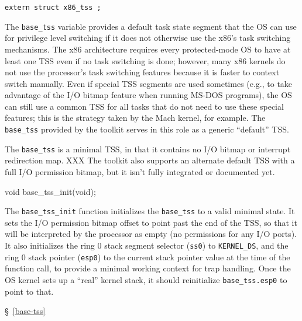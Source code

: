 \label{base-tss}
\begin{apisyn}

	{\tt extern struct x86_tss ;}
\end{apisyn}
\begin{apidesc}
	The {\tt base_tss} variable
	provides a default task state segment
	that the OS can use for privilege level switching
	if it does not otherwise use the x86's task switching mechanisms.
	The x86 architecture requires every protected-mode OS
	to have at least one TSS even if no task switching is done;
	however, many x86 kernels
	do not use the processor's task switching features
	because it is faster to context switch manually.
	Even if special TSS segments are used sometimes
	(e.g., to take advantage of the I/O bitmap feature
	when running MS-DOS programs),
	the OS can still use a common TSS
	for all tasks that do not need to use these special features;
	this is the strategy taken by the Mach kernel, for example.
	The {\tt base_tss} provided by the toolkit
	serves in this role as a generic ``default'' TSS.

	The {\tt base_tss} is a minimal TSS,
	in that it contains no I/O bitmap or interrupt redirection map.
	XXX The toolkit also supports an alternate default TSS
	with a full I/O permission bitmap,
	but it isn't fully integrated or documented yet.
\end{apidesc}

\label{base-tss-init}
\begin{apisyn}

	\funcproto void base_tss_init(void);
\end{apisyn}
\begin{apidesc}
	The {\tt base_tss_init} function
	initializes the {\tt base_tss} to a valid minimal state.
	It sets the I/O permission bitmap offset
	to point past the end of the TSS,
	so that it will be interpreted by the processor as empty
	(no permissions for any I/O ports).
	It also initializes the ring 0 stack segment selector ({\tt ss0})
	to {\tt KERNEL_DS},
	and the ring 0 stack pointer ({\tt esp0})
	to the current stack pointer value at the time of the function call,
	to provide a minimal working context for trap handling.
	Once the OS kernel sets up a ``real'' kernel stack,
	it should reinitialize {\tt base_tss.esp0} to point to that.
\end{apidesc}
\begin{apidep}
	\item[base_tss]		\S~\ref{base-tss}
\end{apidep}

